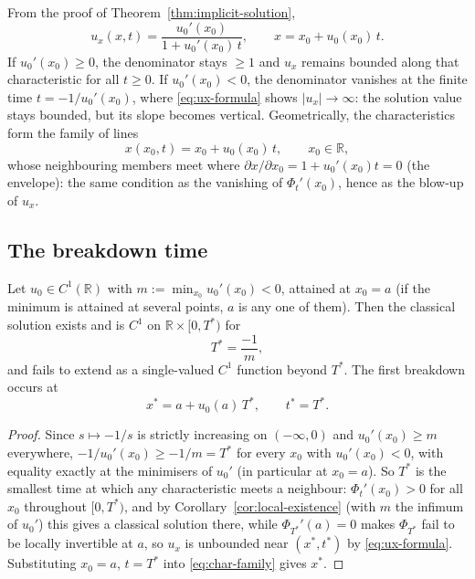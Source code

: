 From the proof of Theorem~\ref{thm:implicit-solution},
\begin{equation}
  \label{eq:ux-formula}
  u_x(x,t) = \frac{u_0'(x_0)}{1 + u_0'(x_0)\, t}, \qquad x = x_0 + u_0(x_0)\, t.
\end{equation}
If $u_0'(x_0) \geq 0$, the denominator stays $\geq 1$ and $u_x$ remains
bounded along that characteristic for all $t\geq0$. If $u_0'(x_0) < 0$,
the denominator vanishes at the finite time $t = -1/u_0'(x_0)$, where
\eqref{eq:ux-formula} shows $|u_x| \to \infty$: the solution value stays
bounded, but its slope becomes vertical. Geometrically, the characteristics
form the family of lines
\begin{equation}
  \label{eq:char-family}
  x(x_0, t) = x_0 + u_0(x_0)\, t, \qquad x_0 \in \mathbb{R},
\end{equation}
whose neighbouring members meet where $\partial x/\partial x_0=1+u_0'(x_0)t=0$
(the envelope): the same condition as the vanishing of $\Phi_t'(x_0)$, hence
as the blow-up of $u_x$.

\subsection{The breakdown time}
\label{subsec:shock-time}

\begin{proposition}
\label{prop:shock-time}
Let $u_0 \in C^1(\mathbb{R})$ with $m := \min_{x_0} u_0'(x_0) < 0$,
attained at $x_0 = a$ (if the minimum is attained at several points, $a$
is any one of them). Then the classical solution exists and is $C^1$ on
$\mathbb{R} \times [0,T^*)$ for
\begin{equation}
  \label{eq:shock-time}
  T^* = \frac{-1}{m},
\end{equation}
and fails to extend as a single-valued $C^1$ function beyond $T^*$. The
first breakdown occurs at
\begin{equation}
  \label{eq:shock-location}
  x^* = a + u_0(a)\, T^*, \qquad t^* = T^*.
\end{equation}
\end{proposition}

\begin{proof}
Since $s \mapsto -1/s$ is strictly increasing on $(-\infty,0)$ and
$u_0'(x_0) \geq m$ everywhere, $-1/u_0'(x_0) \geq -1/m = T^*$ for every
$x_0$ with $u_0'(x_0)<0$, with equality exactly at the minimisers of
$u_0'$ (in particular at $x_0=a$). So $T^*$ is the smallest time at which
any characteristic meets a neighbour: $\Phi_t'(x_0)>0$ for all $x_0$
throughout $[0,T^*)$, and by Corollary~\ref{cor:local-existence} (with
$m$ the infimum of $u_0'$) this gives a classical solution there, while
$\Phi_{T^*}'(a)=0$ makes $\Phi_{T^*}$ fail to be locally invertible at
$a$, so $u_x$ is unbounded near $(x^*,t^*)$ by \eqref{eq:ux-formula}.
Substituting $x_0=a$, $t=T^*$ into \eqref{eq:char-family} gives $x^*$.
\end{proof}

